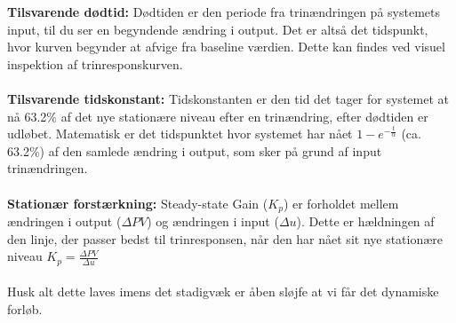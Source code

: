 \documentclass[12pt,a4paper]{article}
\begin{document}
	\noindent\textbf{Tilsvarende dødtid:} Dødtiden er den periode fra trinændringen på systemets input, til du ser en begyndende ændring i output. Det er altså det tidspunkt, hvor kurven begynder at afvige fra baseline værdien. Dette kan findes ved visuel inspektion af trinresponskurven.
	\\\\
	\noindent\textbf{Tilsvarende tidskonstant:} Tidskonstanten er den tid det tager for systemet at nå 63.2\% af det nye stationære niveau efter en trinændring, efter dødtiden er udløbet. Matematisk er det tidspunktet hvor systemet har nået \(1-e^{-\frac{t}{\alpha}}\)
	(ca. 63.2\%) af den samlede ændring i output, som sker på grund af input trinændringen.
	\\\\
	\noindent\textbf{Stationær forstærkning:} 
	Steady-state Gain ($K_p$) er forholdet mellem ændringen i output ($\Delta PV$) og ændringen i input ($\Delta u$). Dette er hældningen af den linje, der passer bedst til trinresponsen, når den har nået sit nye stationære niveau
	\(K_{p} = \frac{\Delta PV}{\Delta u}\)
	\\\\
	\noindent Husk alt dette laves imens det stadigvæk er åben sløjfe at vi får det dynamiske forløb.
\end{document}
